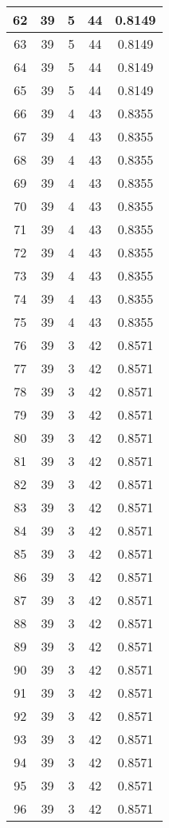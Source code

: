 \documentclass[letterpaper, 12pt]{article}
\begin{document}
\begin{longtable}{|c|c|c|c|c|}
\hline
62 & 39 & 5 & 44 & 0.8149 \\
\hline
63 & 39 & 5 & 44 & 0.8149 \\
\hline
64 & 39 & 5 & 44 & 0.8149 \\
\hline
65 & 39 & 5 & 44 & 0.8149 \\
\hline
66 & 39 & 4 & 43 & 0.8355 \\
\hline
67 & 39 & 4 & 43 & 0.8355 \\
\hline
68 & 39 & 4 & 43 & 0.8355 \\
\hline
69 & 39 & 4 & 43 & 0.8355 \\
\hline
70 & 39 & 4 & 43 & 0.8355 \\
\hline
71 & 39 & 4 & 43 & 0.8355 \\
\hline
72 & 39 & 4 & 43 & 0.8355 \\
\hline
73 & 39 & 4 & 43 & 0.8355 \\
\hline
74 & 39 & 4 & 43 & 0.8355 \\
\hline
75 & 39 & 4 & 43 & 0.8355 \\
\hline
76 & 39 & 3 & 42 & 0.8571 \\
\hline
77 & 39 & 3 & 42 & 0.8571 \\
\hline
78 & 39 & 3 & 42 & 0.8571 \\
\hline
79 & 39 & 3 & 42 & 0.8571 \\
\hline
80 & 39 & 3 & 42 & 0.8571 \\
\hline
81 & 39 & 3 & 42 & 0.8571 \\
\hline
82 & 39 & 3 & 42 & 0.8571 \\
\hline
83 & 39 & 3 & 42 & 0.8571 \\
\hline
84 & 39 & 3 & 42 & 0.8571 \\
\hline
85 & 39 & 3 & 42 & 0.8571 \\
\hline
86 & 39 & 3 & 42 & 0.8571 \\
\hline
87 & 39 & 3 & 42 & 0.8571 \\
\hline
88 & 39 & 3 & 42 & 0.8571 \\
\hline
89 & 39 & 3 & 42 & 0.8571 \\
\hline
90 & 39 & 3 & 42 & 0.8571 \\
\hline
91 & 39 & 3 & 42 & 0.8571 \\
\hline
92 & 39 & 3 & 42 & 0.8571 \\
\hline
93 & 39 & 3 & 42 & 0.8571 \\
\hline
94 & 39 & 3 & 42 & 0.8571 \\
\hline
95 & 39 & 3 & 42 & 0.8571 \\
\hline
96 & 39 & 3 & 42 & 0.8571 \\

\end{longtable}
\end{document}
